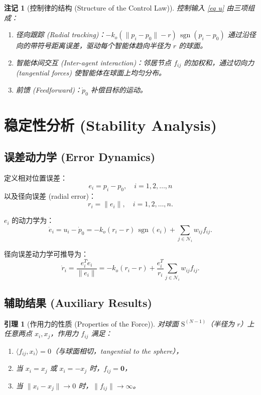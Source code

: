 \documentclass{ctexart}
\DeclareMathOperator{\sgn}{sgn}
\newtheorem{remark}[theorem]{注记}
\newtheorem{lemma}[theorem]{引理}
\begin{document}
\begin{remark}[控制律的结构 (Structure of the Control Law)]
控制输入 \eqref{eq u} 由三项组成：
\begin{enumerate}
    \item \emph{径向跟踪 (Radial tracking)}：$-k_o(\|p_i - p_0\| - r)\,\sgn(p_i - p_0)$ 通过沿径向的带符号距离误差，驱动每个智能体趋向半径为 $r$ 的球面。
    \item \emph{智能体间交互 (Inter-agent interaction)}：邻居节点 $f_{ij}$ 的加权和，通过切向力 (tangential forces) 使智能体在球面上均匀分布。
    \item \emph{前馈 (Feedforward)}：$\dot{p}_0$ 补偿目标的运动。
\end{enumerate}
\end{remark}

\section{稳定性分析 (Stability Analysis)}

\subsection*{误差动力学 (Error Dynamics)}

定义相对位置误差：
\begin{equation}
e_i = p_i - p_0, \quad i = 1,2,\dots,n
\end{equation}
以及径向误差 (radial error)：
\begin{equation}
r_i = \|e_i\|, \quad i = 1,2,\dots,n.
\end{equation}

$e_i$ 的动力学为：
\begin{equation}
\dot{e}_i = u_i - \dot{p}_0 = -k_o(r_i - r)\,\sgn(e_i) + \sum_{j \in \mathcal{N}_i} w_{ij} f_{ij}.
\label{eq: error_dynamics}
\end{equation}

径向误差动力学可推导为：
\begin{equation}
\dot{r}_i = \frac{e_i^T \dot{e}_i}{\|e_i\|} = -k_o(r_i - r) + \frac{e_i^T}{r_i} \sum_{j \in \mathcal{N}_i} w_{ij} f_{ij}.
\label{eq: radial_dynamics}
\end{equation}

\subsection*{辅助结果 (Auxiliary Results)}

\begin{lemma}[作用力的性质 (Properties of the Force)]
对球面 $\mathrm{S}^{(N-1)}$（半径为 $r$）上任意两点 $x_i, x_j$，作用力 $f_{ij}$ 满足：
\begin{enumerate}
    \item $\langle f_{ij}, x_i \rangle = 0$（与球面相切，tangential to the sphere），
    \item 当 $x_i = x_j$ 或 $x_i = -x_j$ 时，$f_{ij} = \mathbf{0}$，
    \item 当 $\|x_i - x_j\| \to 0$ 时，$\|f_{ij}\| \to \infty$。
\end{enumerate}
\end{lemma}
\end{document}
